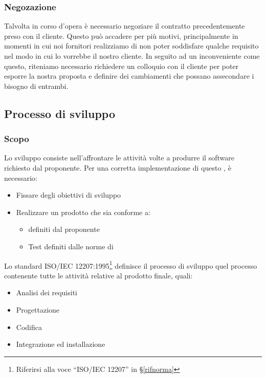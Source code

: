 		\subsubsection{Negozazione}
		Talvolta in corso d'opera è necessario negoziare il contratto precedentemente preso con il cliente.
		Questo può accadere per più motivi, principalmente in momenti in cui noi fornitori realizziamo di non poter soddisfare qualche requisito nel modo in cui lo vorrebbe il nostro cliente.
		In seguito ad un inconveniente come questo, riteniamo necessario richiedere un colloquio con il cliente per poter esporre la nostra proposta e definire dei cambiamenti che possano assecondare i bisogno di entrambi.



    \subsection{Processo di sviluppo}\label{PP:Sviluppo}

		\subsubsection{Scopo}\label{PP:Sviluppo:Scopo}
		Lo sviluppo consiste nell'affrontare le attività volte a produrre il software richiesto dal proponente.
		Per una corretta implementazione di questo , è necessario:
		\begin{itemize}
			\item Fissare degli obiettivi di sviluppo
			\item Realizzare un prodotto che sia conforme a:
			\begin{itemize}
				\item {} definiti dal proponente
				\item Test definiti dalle norme di 
			\end{itemize}
		\end{itemize}
		Lo standard ISO/IEC 12207:1995\footnote{Riferirsi alla voce ``ISO/IEC 12207'' in \S\ref{rifnorma}} definisce il processo di
		sviluppo quel processo contenente tutte le attività relative al prodotto finale, quali:
		\begin{itemize} %
			\item Analisi dei requisiti
			\item Progettazione
			\item Codifica
			\item Integrazione ed installazione
		\end{itemize}


